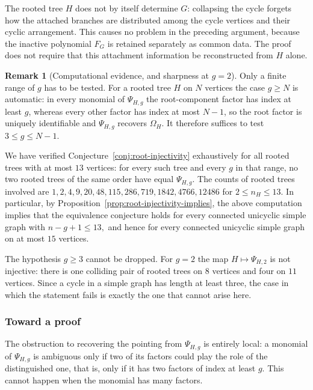 \documentclass[11pt]{article}
\theoremstyle{plain}
\theoremstyle{definition}
\newtheorem{remark}[theorem]{Remark}
\numberwithin{equation}{section}
\begin{document}
The rooted tree $H$ does not by itself determine $G$: collapsing the cycle forgets
how the attached branches are distributed among the cycle vertices and their cyclic arrangement.
This causes no problem in the preceding argument, because the inactive polynomial $F_G$
is retained separately as common data.
The proof does not require that this attachment information be reconstructed from $H$ alone.

\begin{remark}[Computational evidence, and sharpness at $g=2$]
\label{rem:g-two-fails}
Only a finite range of $g$ has to be tested.
For a rooted tree $H$ on $N$ vertices the case $g\ge N$ is automatic:
in every monomial of $\Psi_{H,g}$ the root-component factor has index at least $g$,
whereas every other factor has index at most $N-1$, so the root factor
is uniquely identifiable and $\Psi_{H,g}$ recovers $\Omega_H$.
It therefore suffices to test $3\le g\le N-1$.

We have verified Conjecture~\ref{conj:root-injectivity} exhaustively for all
rooted trees with at most $13$ vertices: for every such tree and every $g$ in that range,
no two rooted trees of the same order have equal $\Psi_{H,g}$.
The counts of rooted trees involved are
$1,2,4,9,20,48,115,286,719,1842,4766,12486$ for $2\le n_H\le13$.  In particular,
by Proposition~\ref{prop:root-injectivity-implies}, the above
computation implies that the equivalence conjecture holds for every connected
unicyclic simple graph with $ n-g+1\le13,$
and hence for every connected unicyclic simple graph on at most $15$ vertices.

The hypothesis $g\ge 3$ cannot be dropped.  For $g=2$ the map $H\mapsto \Psi_{H,2}$
is not injective: there is one colliding pair of rooted trees on $8$ vertices
and four on $11$ vertices.  Since a cycle in a simple graph has length at
least three, the case in which the statement fails is exactly the one that cannot arise here.
\end{remark}

\subsubsection*{Toward a proof}

The obstruction to recovering the pointing from $\Psi_{H,g}$ is entirely local: a
monomial of $\Psi_{H,g}$ is ambiguous only if two of its factors could play the
role of the distinguished one, that is, only if it has two factors of index at
least $g$.  This cannot happen when the monomial has many factors.
\end{document}
